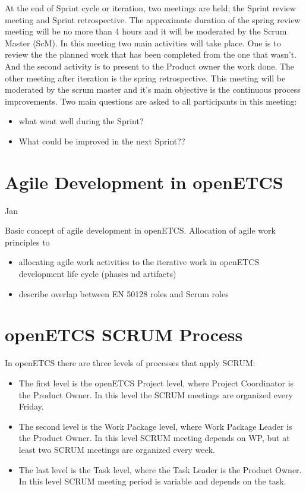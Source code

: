 At the end of Sprint cycle or iteration, two meetings are held; the Sprint review meeting and Sprint retrospective. The approximate duration of the spring review meeting will be no more than 4 hours and it will be moderated by the Scrum Master (ScM). In this meeting two main activities will take place. One is to review the the planned work that has been completed from the one that wasn't. And the second activity is to present to the Product owner the work done. The other meeting after iteration is the spring retrospective. This meeting will be moderated by the scrum master and it's main objective is the continuous process improvements. Two main questions are asked to all participants in this meeting:
\begin{itemize}
\item   what went well during the Sprint? 
\item What could be improved in the next Sprint?? 
\end{itemize}


\chapter{Agile Development in openETCS}
\label{sec:agile}

Jan
\reversemarginpar
{}

Basic concept of agile development in openETCS.
Allocation of agile work principles to 

\begin{itemize}
\item allocating agile work activities to the iterative work in openETCS development life cycle (phases nd artifacts) 
\item describe overlap between EN 50128 roles and Scrum roles
\end{itemize}



\chapter{openETCS SCRUM Process}
\label{sec:ScrumProzess}

In openETCS there are three levels of processes that apply SCRUM:
\begin{itemize}
	\item The first level is the openETCS Project level, where Project Coordinator is the Product Owner. In this level the SCRUM meetings are organized every Friday.
	\item The second level is the Work Package level, where Work Package Leader is the Product Owner. In this level SCRUM meeting depends on WP, but at least two SCRUM meetings are organized every week.
	\item The last level is the Task level, where the Task Leader is the Product Owner. In this level SCRUM meeting period is variable and depends on the task.
\end{itemize}

